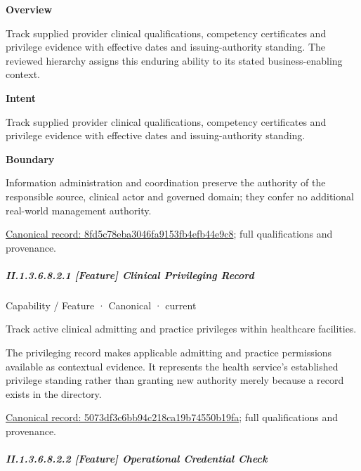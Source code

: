 \textbf{Overview}



Track supplied provider clinical qualifications, competency certificates and privilege evidence with effective dates and issuing-authority standing. The reviewed hierarchy assigns this enduring ability to its stated business-enabling context.



\textbf{Intent}



Track supplied provider clinical qualifications, competency certificates and privilege evidence with effective dates and issuing-authority standing.



\textbf{Boundary}



Information administration and coordination preserve the authority of the responsible source, clinical actor and governed domain; they confer no additional real-world management authority.


{\footnotesize \href{../../../../../../../continuum/strategy/capability/8fd5c78eba3046fa9153fb4efb44e9c8.md}{Canonical record: 8fd5c78eba3046fa9153fb4efb44e9c8}; full qualifications and provenance.}\par
\subparagraph*{II.1.3.6.8.2.1 [Feature] Clinical Privileging Record}
\label{navigation:II.1.3.6.8.2.1}

\label{element:5073df3c6bb94c218ca19b74550b19fa}
{\small Capability / Feature · Canonical · current}\par

Track active clinical admitting and practice privileges within healthcare facilities.



The privileging record makes applicable admitting and practice permissions available as contextual evidence. It represents the health service's established privilege standing rather than granting new authority merely because a record exists in the directory.


{\footnotesize \href{../../../../../../../continuum/strategy/capability/feature/5073df3c6bb94c218ca19b74550b19fa.md}{Canonical record: 5073df3c6bb94c218ca19b74550b19fa}; full qualifications and provenance.}\par
\subparagraph*{II.1.3.6.8.2.2 [Feature] Operational Credential Check}
\label{navigation:II.1.3.6.8.2.2}

